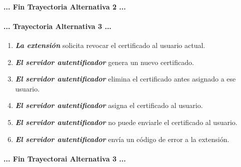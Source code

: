 \documentclass[12pt, a4paper, titlepage]{report}
\begin{document}
		\paragraph{... Fin Trayectoria Alternativa 2 ...}
		
		\paragraph{... Trayectoria Alternativa 3 ...}
		\begin{enumerate}
		    \item \textbf{\textit{La extensión}} solicita revocar el certificado al usuario actual.
		    
		    \item \textbf{\textit{El servidor autentificador}} genera un nuevo certificado.
		    
		    \item \textbf{\textit{El servidor autentificador}} elimina el certificado antes asignado a ese usuario.
		    
		    \item \textbf{\textit{El servidor autentificador}} asigna el certificado al usuario.
		    
		    \item \textbf{\textit{El servidor autentificador}} no puede enviarle el certificado al usuario.
		    
		    \item \textbf{\textit{El servidor autentificador}} envía un código de error a la extensión.
		\end{enumerate}
		\paragraph{... Fin Trayectorai Alternativa 3 ...}
		
\end{document}
